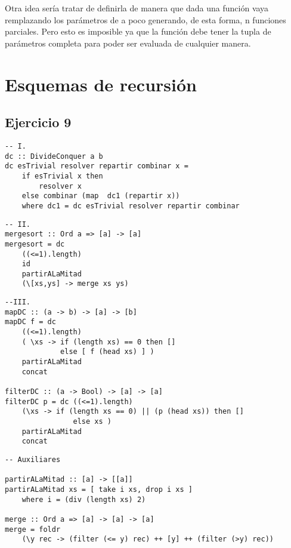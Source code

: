 \documentclass[10pt,a4paper]{article}
\begin{document}
Otra idea sería tratar de definirla de manera que dada una función vaya remplazando los parámetros de a poco generando, de esta forma, n funciones parciales. Pero esto es imposible ya que la función debe tener la tupla de parámetros completa para poder ser evaluada de cualquier manera.

\section*{Esquemas de recursión}
\subsection{Ejercicio 9}
\begin{centrado}
	\begin{verbatim}
-- I.
dc :: DivideConquer a b
dc esTrivial resolver repartir combinar x = 
	if esTrivial x then 
		resolver x 
	else combinar (map  dc1 (repartir x))
	where dc1 = dc esTrivial resolver repartir combinar

\end{verbatim}
\end{centrado}

\begin{centrado}
	\begin{verbatim}
-- II.
mergesort :: Ord a => [a] -> [a]
mergesort = dc
    ((<=1).length)
    id
    partirALaMitad
    (\[xs,ys] -> merge xs ys)	
	\end{verbatim}
\end{centrado}

\begin{centrado}
	\begin{verbatim}
--III.    
mapDC :: (a -> b) -> [a] -> [b]
mapDC f = dc 
    ((<=1).length)
    ( \xs -> if (length xs) == 0 then [] 
	         else [ f (head xs) ] )
    partirALaMitad
    concat

filterDC :: (a -> Bool) -> [a] -> [a]
filterDC p = dc ((<=1).length)
	(\xs -> if (length xs == 0) || (p (head xs)) then []
		        else xs )
	partirALaMitad
	concat
	\end{verbatim}
\end{centrado}

\begin{centrado}
	\begin{verbatim}
-- Auxiliares

partirALaMitad :: [a] -> [[a]]
partirALaMitad xs = [ take i xs, drop i xs ] 
	where i = (div (length xs) 2)

merge :: Ord a => [a] -> [a] -> [a]
merge = foldr 
	(\y rec -> (filter (<= y) rec) ++ [y] ++ (filter (>y) rec))
	\end{verbatim}
\end{centrado}
\end{document}
